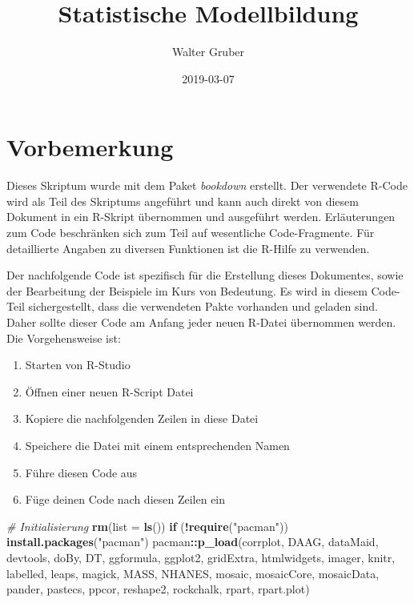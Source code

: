 \documentclass[]{article}
\title{Statistische Modellbildung}
\author{Walter Gruber}
\date{2019-03-07}
\newenvironment{Shaded}{\begin{snugshade}}{\end{snugshade}}
\newcommand{\KeywordTok}[1]{\textcolor[rgb]{0.13,0.29,0.53}{\textbf{#1}}}
\newcommand{\DataTypeTok}[1]{\textcolor[rgb]{0.13,0.29,0.53}{#1}}
\newcommand{\StringTok}[1]{\textcolor[rgb]{0.31,0.60,0.02}{#1}}
\newcommand{\CommentTok}[1]{\textcolor[rgb]{0.56,0.35,0.01}{\textit{#1}}}
\newcommand{\ControlFlowTok}[1]{\textcolor[rgb]{0.13,0.29,0.53}{\textbf{#1}}}
\newcommand{\OperatorTok}[1]{\textcolor[rgb]{0.81,0.36,0.00}{\textbf{#1}}}
\newcommand{\NormalTok}[1]{#1}
\providecommand{\tightlist}{%
  \setlength{\itemsep}{0pt}\setlength{\parskip}{0pt}}
\begin{document}
\maketitle

{
\setcounter{tocdepth}{2}
\tableofcontents
}
\section*{Vorbemerkung}\label{vorbemerkung}

Dieses Skriptum wurde mit dem Paket \emph{bookdown} erstellt. Der
verwendete R-Code wird als Teil des Skriptums angeführt und kann auch
direkt von diesem Dokument in ein R-Skript übernommen und ausgeführt
werden. Erläuterungen zum Code beschränken sich zum Teil auf wesentliche
Code-Fragmente. Für detaillierte Angaben zu diversen Funktionen ist die
R-Hilfe zu verwenden.

Der nachfolgende Code ist spezifisch für die Erstellung dieses
Dokumentes, sowie der Bearbeitung der Beispiele im Kurs von Bedeutung.
Es wird in diesem Code-Teil sichergestellt, dass die verwendeten Pakte
vorhanden und geladen sind. Daher sollte dieser Code am Anfang jeder
neuen R-Datei übernommen werden. Die Vorgehensweise ist:

\begin{enumerate}
\def\labelenumi{\arabic{enumi}.}
\tightlist
\item
  Starten von R-Studio
\item
  Öffnen einer neuen R-Script Datei
\item
  Kopiere die nachfolgenden Zeilen in diese Datei
\item
  Speichere die Datei mit einem entsprechenden Namen
\item
  Führe diesen Code aus
\item
  Füge deinen Code nach diesen Zeilen ein
\end{enumerate}

\begin{Shaded}
\begin{Highlighting}[]
\CommentTok{# Initialisierung}
\KeywordTok{rm}\NormalTok{(}\DataTypeTok{list =} \KeywordTok{ls}\NormalTok{())}
\ControlFlowTok{if}\NormalTok{ (}\OperatorTok{!}\KeywordTok{require}\NormalTok{(}\StringTok{"pacman"}\NormalTok{)) }\KeywordTok{install.packages}\NormalTok{(}\StringTok{"pacman"}\NormalTok{)}
\NormalTok{pacman}\OperatorTok{::}\KeywordTok{p_load}\NormalTok{(corrplot, DAAG, dataMaid, devtools, doBy, DT, }
\NormalTok{               ggformula, ggplot2, gridExtra, htmlwidgets, }
\NormalTok{               imager, knitr, labelled, leaps, magick, MASS, }
\NormalTok{               NHANES, mosaic, mosaicCore, mosaicData, pander,}
\NormalTok{               pastecs, ppcor, reshape2, }
\NormalTok{               rockchalk, rpart, rpart.plot)}
\end{Highlighting}
\end{Shaded}
\end{document}
